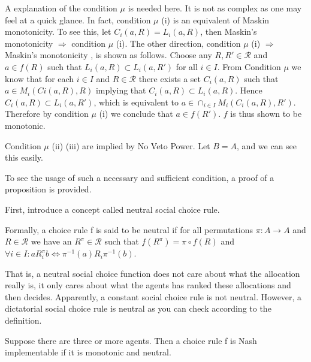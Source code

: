 A explanation of the condition $\mu$ is needed here. It is not as complex as one may feel at a quick glance. In fact, 
condition $\mu$ (i) is an equivalent of Maskin monotonicity.  To see
this, let $C_i(a,R)= L_i(a,R)$, then Maskin's monotonicity
$\Rightarrow$ condition $\mu$ (i). The other direction,  condition
$\mu$ (i) $\Rightarrow$ Maskin's monotonicity , is shown as follows.
Choose any  $R, R' \in \mathscr{R}$ and $a \in f(R)$ such that $L_i(a, R)
\subset L_i(a, R')$ for all $i \in I$. From  Condition $\mu$ we know
that  for  each $i \in I$ and $R \in \mathscr{R}$ there  exists  a set
$C_i(a, R)$ such  that  $a \in  M_i(Ci(a,  R),  R)$  implying  that
$C_i(a, R) \subset  L_i(a,R)$.   Hence $C_i(a, R) \subset  L_i(a,R')$,
which is equivalent to $a \in \cap_{i \in I}M_i(C_i(a,R),
R')$. Therefore by condition $\mu$ (i) we conclude that $a \in
f(R')$.  $f$ is thus shown to be monotonic.

Condition $\mu$ (ii) (iii) are implied by No Veto Power. Let $B=A$, and 
we can see this easily.

To see the usage of such a necessary and sufficient condition, a proof
of a proposition is provided.

First,  introduce a concept called neutral social choice rule.
\begin{definition}   
Formally,  a choice rule  f  is  said  to  be neutral  if  for  all  permutations  $\pi:  A \rightarrow A$  and  $R \in \mathscr{R}$
  we have an $R^\pi \in \mathscr{R}$ such that $f(R^\pi) = \pi \circ f(R) $  and  $\forall i \in I: a R^\pi_i b \Longleftrightarrow \pi^{-1}(a) R_i \pi^{-1}(b)$.  
  \end{definition}

That is, a neutral social choice function does not care about what the
allocation really is, it only cares about what the agents has ranked
these allocations and then decides. Apparently, a constant social
choice rule  is not neutral. However, a dictatorial social choice
rule is neutral as you can check according to the definition.


\begin{prop}
  Suppose there are three or more agents. Then a choice rule f is
Nash implementable if it is monotonic and neutral.
  
\end{prop}

